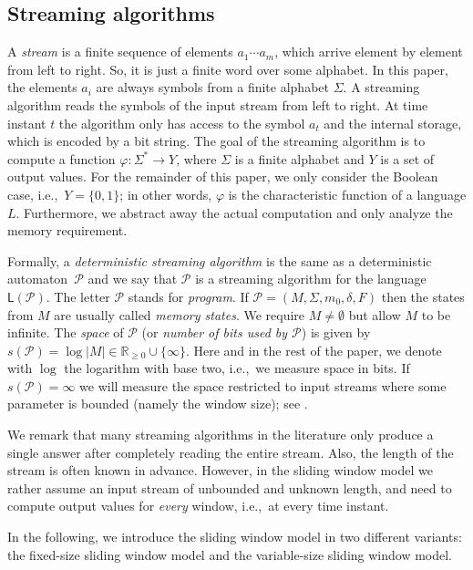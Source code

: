 \documentclass{article}\usepackage[a4paper,margin=20mm]{geometry}
\renewcommand{\P}{\mathcal{P}}
\renewcommand{\L}{\mathsf{L}}
\renewcommand{\geq}{\geqslant}
\renewcommand{\ge}{\geq}
\begin{document}
\subsection{Streaming algorithms} \label{sec streaming general}

A {\em stream} is a finite sequence of elements $a_1 \cdots a_m$,
which arrive element by element from left to right. So, it is just a finite word over some alphabet.
In this paper, the elements $a_i$ are always symbols from a finite alphabet $\Sigma$.
A streaming algorithm reads the symbols of the input stream from left to right.
At time instant $t$ the algorithm only has access to the symbol $a_t$
and the internal storage, which is encoded by a bit string.
The goal of the streaming algorithm is to compute a function $\varphi \colon \Sigma^* \to Y$,
where $\Sigma$ is a finite alphabet and $Y$ is a set of output values.
For the remainder of this paper, we only consider the Boolean case, i.e.,~$Y = \{0,1\}$;
in other words, $\varphi$ is the characteristic function of a language $L$.
Furthermore, we abstract away the actual computation and only analyze
the memory requirement.

Formally, a {\em deterministic streaming algorithm} is the same as 
a deterministic automaton~$\P$ and we say that 
$\P$ is a streaming algorithm for the language $\L(\P)$.
The letter $\P$ stands for {\em program}. If $\P = (M,\Sigma,m_0,\delta,F)$
then the states from $M$ are usually called {\em memory states}.
We require $M \neq \emptyset$ but allow $M$ to be infinite.
The {\em space} of $\P$ (or {\em number of bits used by $\P$}) is given by
$s(\P) = \log |M| \in \mathbb{R}_{\ge 0} \cup \{ \infty \}$.
Here and in the rest of the paper, we denote with $\log$
the logarithm with base two, i.e.,~we measure space in bits.
If $s(\P) = \infty$ we will measure the space restricted to input streams
where some parameter is bounded (namely the window size); see .


We remark that many streaming algorithms in the literature only produce a single answer
after completely reading the entire stream.
Also, the length of the stream is often known in advance.
However, in the sliding window model we rather assume an input stream of unbounded and unknown length,
and need to compute output values for {\em every} window, i.e.,~at every time instant.

In the following, we introduce the sliding window model in two different variants: the 
fixed-size sliding window model and the variable-size sliding window model.
\end{document}
